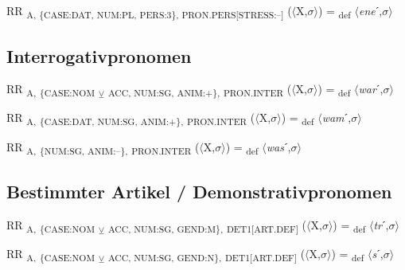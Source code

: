 {\begin{exe}
 RR \textsubscript{A, \{CASE:DAT, NUM:PL, PERS:3\}, PRON.PERS[STRESS:–]} ($\langle$X,$\sigma $$\rangle$) = \textsubscript{def} $\langle$\textit{ene}ˊ,$\sigma $$\rangle$
\end{exe}

\subsection{Interrogativpronomen}

\begin{exe}
 RR \textsubscript{A,} \textsubscript{\{CASE:NOM} \textsubscript{${\veebar}$}\textsubscript{ ACC, NUM:SG, ANIM:+\},} \textsubscript{PRON.INTER} ($\langle$X,$\sigma $$\rangle$) = \textsubscript{def} $\langle$\textit{war}ˊ,$\sigma $$\rangle$
\end{exe}

\begin{exe}
 RR \textsubscript{A,} \textsubscript{\{CASE:DAT, NUM:SG, ANIM:+\},} \textsubscript{PRON.INTER} ($\langle$X,$\sigma $$\rangle$) = \textsubscript{def} $\langle$\textit{wam}ˊ,$\sigma $$\rangle$
\end{exe}

\begin{exe}
 RR \textsubscript{A,} \textsubscript{\{NUM:SG, ANIM:–\},} \textsubscript{PRON.INTER} ($\langle$X,$\sigma $$\rangle$) = \textsubscript{def} $\langle$\textit{was}ˊ,$\sigma $$\rangle$
\end{exe}

\subsection{Bestimmter Artikel / Demonstrativpronomen}


\begin{exe}
 RR \textsubscript{A,} \textsubscript{\{CASE:NOM} \textsubscript{${\veebar}$}\textsubscript{ ACC, NUM:SG, GEND:M\},} \textsubscript{DET1[ART.DEF]} ($\langle$X,$\sigma $$\rangle$) = \textsubscript{def} $\langle$\textit{tr}ˊ,$\sigma $$\rangle$
\end{exe}

\begin{exe}
 RR \textsubscript{A,} \textsubscript{\{CASE:NOM} \textsubscript{${\veebar}$}\textsubscript{ ACC, NUM:SG, GEND:N\},} \textsubscript{DET1[ART.DEF]} ($\langle$X,$\sigma $$\rangle$) = \textsubscript{def} $\langle$\textit{s}ˊ,$\sigma $$\rangle$
\end{exe}

}
